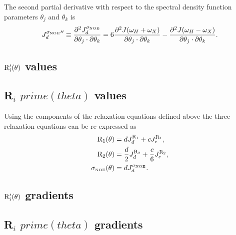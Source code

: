 \noindent The second partial derivative with respect to the spectral density function parameters $\theta_j$ and $\theta_k$ is
\begin{equation}
    {J_d^{\sigma_{\scriptscriptstyle \mathrm{NOE}}}}'' \equiv \frac{\partial^2 J_d^{\sigma_{\scriptscriptstyle \mathrm{NOE}}}}{\partial \theta_j \cdot \partial \theta_k}
        = 6 \frac{\partial^2 J(\omega_H + \omega_X)}{\partial \theta_j \cdot \partial \theta_k}
          - \frac{\partial^2 J(\omega_H - \omega_X)}{\partial \theta_j \cdot \partial \theta_k}.  \label{eq: J terms: JsigmaNOEd"}
\end{equation}




\begin{latexonly}
    \subsection{$\mathrm{R}_i'(\theta)$ values}
\end{latexonly}
\begin{htmlonly}
    \subsection{R$_i$ $prime(theta)$ values}
\end{htmlonly}

Using the components of the relaxation equations defined above the three relaxation equations can be re-expressed as
\begin{subequations}
\begin{align}
    \mathrm{R}_1(\theta) & = d J_d^{\mathrm{R}_1} + c J_c^{\mathrm{R}_1},                          \label{eq: Ri': R1} \\
    \mathrm{R}_2(\theta) & = \frac{d}{2} J_d^{\mathrm{R}_2} + \frac{c}{6} J_c^{\mathrm{R}_2},      \label{eq: Ri': R2} \\
    \sigma_{\scriptscriptstyle \mathrm{NOE}}(\theta) & = d J_d^{\sigma_{\scriptscriptstyle \mathrm{NOE}}}.                          \label{eq: Ri': sigmaNOE}
\end{align}
\end{subequations}




\begin{latexonly}
    \subsection{$\mathrm{R}_i'(\theta)$ gradients}
\end{latexonly}
\begin{htmlonly}
    \subsection{R$_i$ $prime(theta)$ gradients}
\end{htmlonly}

